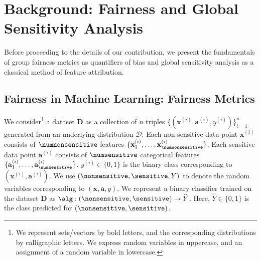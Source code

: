\section{Background: Fairness and Global Sensitivity Analysis}\label{sec:preliminaries}\vspace*{-.5em}
Before proceeding to the details of our contribution, we present the fundamentals of group fairness metrics as quantifiers of bias and global sensitivity analysis as a classical method of feature attribution.\vspace*{-.5em}
\subsection{Fairness in Machine Learning: Fairness Metrics}
We consider\footnote{{We represent sets/vectors by bold letters, and the corresponding distributions by calligraphic letters. We express random variables in uppercase, and an assignment of a random variable in lowercase.}} a dataset $ \mathbf{D} $ as a collection of $n$ triples  $\{(\mathbf{x}^{(i)}, \mathbf{a}^{(i)}, y^{(i)})\}_{i=1}^n$ 
 generated from an underlying distribution $\mathcal{D}$. Each non-sensitive data point $\mathbf{x}^{(i)}$ consists of $\numnonsensitive$ features $\{\mathbf{x}^{(i)}_1, \dots, \mathbf{x}^{(i)}_{\numnonsensitive}\} $. Each sensitive data point $\mathbf{a}^{(i)}$ consists of $\numsensitive$ categorical features $\{\mathbf{a}^{(i)}_1, \dots, \mathbf{a}^{(i)}_{\numsensitive}\} $.  $y^{(i)} \in \{0,1\}$ is the binary class corresponding to $(\mathbf{x}^{(i)}, \mathbf{a}^{(i)})$. %
 We use $ (\nonsensitive, \sensitive, Y) $ to denote the random variables corresponding to $ (\mathbf{x}, \mathbf{a}, y)$.  
 We represent a binary classifier trained on the dataset $\mathbf{D}$ as $\alg: (\nonsensitive, \sensitive) \rightarrow \widehat{Y} $. Here, $\widehat{Y} \in \{0,1\}$ is the class predicted for $ (\nonsensitive, \sensitive) $.
